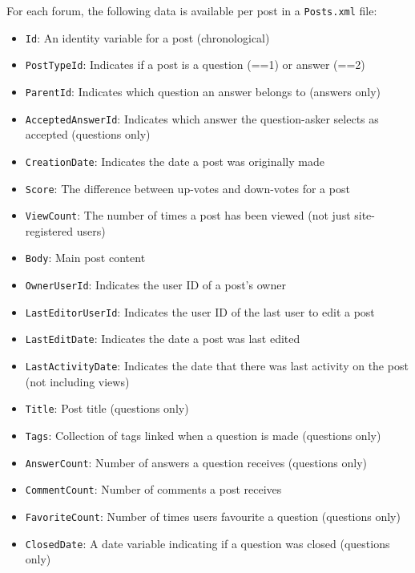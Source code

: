\documentclass[12pt,preprint, authoryear]{article}
\numberwithin{equation}{section}
\numberwithin{figure}{section}
\numberwithin{table}{section}
\begin{document}
\normalsize

For each forum, the following data is available per post in a
\texttt{Posts.xml} file:


\begin{itemize}
\item
  \texttt{Id}: An identity variable for a post (chronological)
\item
  \texttt{PostTypeId}: Indicates if a post is a question (==1) or answer
  (==2)
\item
  \texttt{ParentId}: Indicates which question an answer belongs to
  (answers only)
\item
  \texttt{AcceptedAnswerId}: Indicates which answer the question-asker
  selects as accepted (questions only)
\item
  \texttt{CreationDate}: Indicates the date a post was originally made
\item
  \texttt{Score}: The difference between up-votes and down-votes for a
  post
\item
  \texttt{ViewCount}: The number of times a post has been viewed (not
  just site-registered users)
\item
  \texttt{Body}: Main post content
\item
  \texttt{OwnerUserId}: Indicates the user ID of a post's owner
\item
  \texttt{LastEditorUserId}: Indicates the user ID of the last user to
  edit a post
\item
  \texttt{LastEditDate}: Indicates the date a post was last edited
\item
  \texttt{LastActivityDate}: Indicates the date that there was last
  activity on the post (not including views)
\item
  \texttt{Title}: Post title (questions only)
\item
  \texttt{Tags}: Collection of tags linked when a question is made
  (questions only)
\item
  \texttt{AnswerCount}: Number of answers a question receives (questions
  only)
\item
  \texttt{CommentCount}: Number of comments a post receives
\item
  \texttt{FavoriteCount}: Number of times users favourite a question
  (questions only)
\item
  \texttt{ClosedDate}: A date variable indicating if a question was
  closed (questions only)
\end{itemize}
\end{document}
